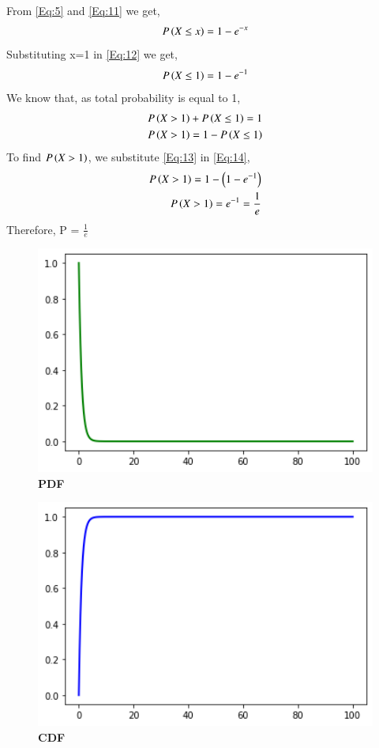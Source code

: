 \documentclass[journal,12pt,twocolumn]{IEEEtran}
\begin{document}
From \eqref{Eq:5} and \eqref{Eq:11} we get,
\begin{align}
P\left(X\leq x\right) = 1-e^{-x} \label{Eq:12}
\end{align}
Substituting x=1 in \eqref{Eq:12} we get,
\begin{align}
P\left(X\leq 1\right) = 1-e^{-1} \label{Eq:13}
\end{align}
We know that, as total probability is equal to 1,
\begin{align}
P\left(X>1\right)+P\left(X\leq1\right)=1 \\
P\left(X>1\right)=1-P\left(X\leq 1\right)\label{Eq:14}
\end{align}
To find $P\left(X>1\right)$, we substitute \eqref{Eq:13} in \eqref{Eq:14},
\begin{align}
P\left(X>1\right)=1-\left(1-e^{-1}\right) \\
P\left(X>1\right)=e^{-1}=\frac{1}{e} \label{Eq:15}
\end{align}
Therefore, P = $\frac{1}{e}$
\newpage
\begin{figure}
\includegraphics[width=15cm]{figure_1.png}
    \caption{\textbf{\huge{PDF}}} 
\end{figure}
\begin{figure}
\includegraphics[width=15cm]{figure_2.png}
    \caption{\textbf{\huge{CDF}}}
\end{figure}
\end{document}
